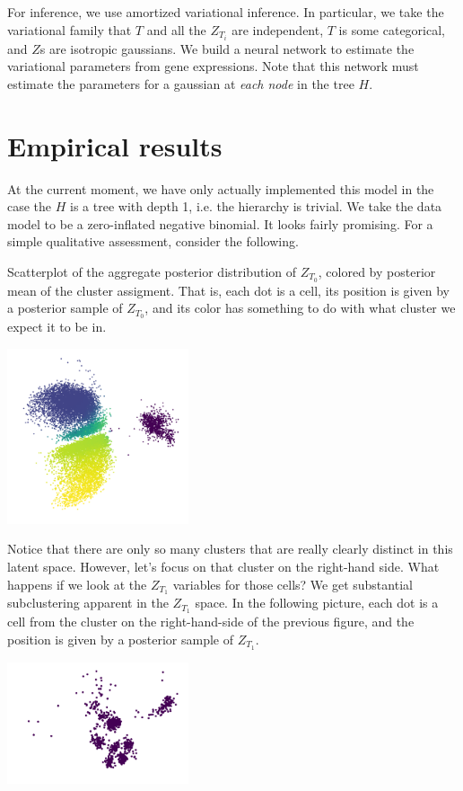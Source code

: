 For inference, we use amortized variational inference.  In particular, we take the variational family that $T$ and all the $Z_{T_i}$ are independent, $T$ is some categorical, and $Z$s are isotropic gaussians.  We build a neural network to estimate the variational parameters from gene expressions.  Note that this network must estimate the parameters for a gaussian at \emph{each node} in the tree $H$.

\section{Empirical results}

At the current moment, we have only actually implemented this model in the case the $H$ is a tree with depth 1, i.e. the hierarchy is trivial.   We take the data model to be a zero-inflated negative binomial.  It looks fairly promising.  For a simple qualitative assessment, consider the following.

Scatterplot of the aggregate posterior distribution of $Z_{T_0}$, colored by posterior mean of the cluster assigment.  That is, each dot is a cell, its position is given by a posterior sample of $Z_{T_0}$, and its color has something to do with what cluster we expect it to be in.  

\includegraphics[width=0.4\textwidth]{pics/Z1}

Notice that there are only so many clusters that are really clearly distinct in this latent space.  However, let's focus on that cluster on the right-hand side.  What happens if we look at the $Z_{T_1}$ variables for those cells?  We get substantial subclustering apparent in the $Z_{T_1}$ space.  In the following picture, each dot is a cell from the cluster on the right-hand-side of the previous figure, and the position is given by a posterior sample of $Z_{T_1}$.

\includegraphics[width=0.4\textwidth]{pics/Z2}



